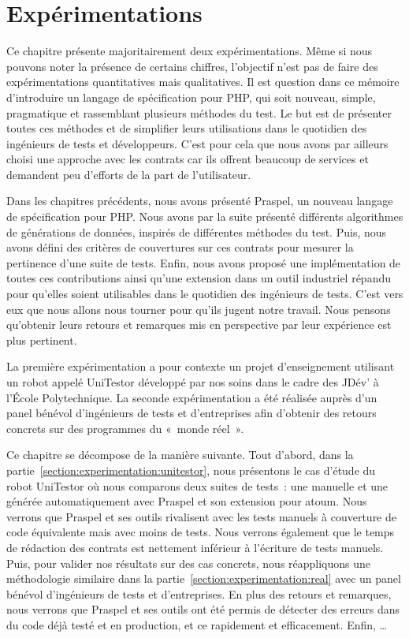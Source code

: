 \chapter{Expérimentations}
\label{chapter:experimentations}

\minitoc

Ce chapitre présente majoritairement deux expérimentations. Même si nous pouvons
noter la présence de certains chiffres, l'objectif n'est pas de faire des
expérimentations {\strong quantitatives} mais {\strong qualitatives}.
Il est question dans ce mémoire d'introduire un langage de spécification pour
PHP, qui soit nouveau, simple, pragmatique et rassemblant plusieurs méthodes du
test. Le but est de présenter toutes ces méthodes et de simplifier leurs
utilisations dans le quotidien des ingénieurs de tests et développeurs. C'est
pour cela que nous avons par ailleurs choisi une approche avec les contrats car
ils offrent beaucoup de services et demandent peu d'efforts de la part de
l'utilisateur.

Dans les chapitres précédents, nous avons présenté Praspel, un nouveau langage
de spécification pour PHP. Nous avons par la suite présenté différents
algorithmes de générations de données, inspirés de différentes méthodes du test.
Puis, nous avons défini des critères de couvertures sur ces contrats pour
mesurer la pertinence d'une suite de tests. Enfin, nous avons proposé une
implémentation de toutes ces contributions ainsi qu'une extension dans un outil
industriel répandu pour qu'elles soient utilisables dans le quotidien des
ingénieurs de tests. C'est vers eux que nous allons nous tourner pour qu'ils
jugent notre travail. Nous pensons qu'obtenir leurs retours et remarques mis
en perspective par leur expérience est plus pertinent.

La première expérimentation a pour contexte un projet d'enseignement utilisant
un robot appelé UniTestor développé par nos soins dans le cadre des JDév' à
l'École Polytechnique. La seconde expérimentation a été réalisée auprès d'un
panel bénévol d'ingénieurs de tests et d'entreprises afin d'obtenir des retours
concrets sur des programmes du «~monde réel~».

Ce chapitre se décompose de la manière suivante. Tout d'abord, dans la
partie~\ref{section:experimentation:unitestor}, nous présentons le cas d'étude
du robot UniTestor où nous comparons deux suites de tests~: une manuelle et une
générée automatiquement avec Praspel et son extension pour atoum. Nous verrons
que Praspel et ses outils rivalisent avec les tests manuels à couverture de code
équivalente mais avec moins de tests. Nous verrons également que le temps de
rédaction des contrats est nettement inférieur à l'écriture de tests manuels.
Puis, pour valider nos résultats sur des cas concrets, nous réappliquons une
méthodologie similaire dans la partie~\ref{section:experimentation:real} avec un
panel bénévol d'ingénieurs de tests et d'entreprises. En plus des retours et
remarques, nous verrons que Praspel et ses outils ont été permis de détecter des
erreurs dans du code déjà testé et en production, et ce rapidement et
efficacement. Enfin, …

